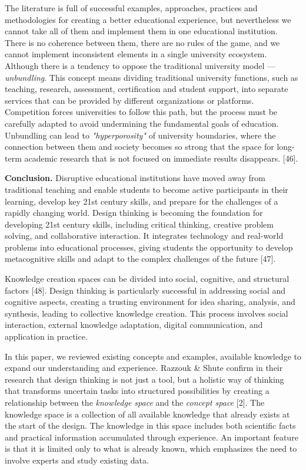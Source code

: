 \begin{multicols}{2}
The literature is full of successful examples, approaches, practices and
methodologies for creating a better educational experience, but
nevertheless we cannot take all of them and implement them in one
educational institution. There is no coherence between them, there are
no rules of the game, and we cannot implement inconsistent elements in a
single university ecosystem. Although there is a tendency to oppose the
traditional university model --- \emph{unbundling}. This concept means
dividing traditional university functions, such as teaching, research,
assessment, certification and student support, into separate services
that can be provided by different organizations or platforms.
Competition forces universities to follow this path, but the process
must be carefully adapted to avoid undermining the fundamental goals of
education. Unbundling can lead to \emph{"hyperporosity"} of university
boundaries, where the connection between them and society becomes so
strong that the space for long-term academic research that is not
focused on immediate results disappears. {[}46{]}.

{\bfseries Conclusion.} Disruptive educational institutions have moved away
from traditional teaching and enable students to become active
participants in their learning, develop key 21st century skills, and
prepare for the challenges of a rapidly changing world. Design thinking
is becoming the foundation for developing 21st century skills, including
critical thinking, creative problem solving, and collaborative
interaction. It integrates technology and real-world problems into
educational processes, giving students the opportunity to develop
metacognitive skills and adapt to the complex challenges of the future
{[}47{]}.

Knowledge creation spaces can be divided into social, cognitive, and
structural factors {[}48{]}. Design thinking is particularly successful
in addressing social and cognitive aspects, creating a trusting
environment for idea sharing, analysis, and synthesis, leading to
collective knowledge creation. This process involves social interaction,
external knowledge adaptation, digital communication, and application in
practice.

In this paper, we reviewed existing concepts and examples, available
knowledge to expand our understanding and experience. Razzouk \& Shute
confirm in their research that design thinking is not just a tool, but a
holistic way of thinking that transforms uncertain tasks into structured
possibilities by creating a relationship between the \emph{knowledge
space} and the \emph{concept space} {[}2{]}. The knowledge space is a
collection of all available knowledge that already exists at the start
of the design. The knowledge in this space includes both scientific
facts and practical information accumulated through experience. An
important feature is that it is limited only to what is already known,
which emphasizes the need to involve experts and study existing data.


\end{multicols}
